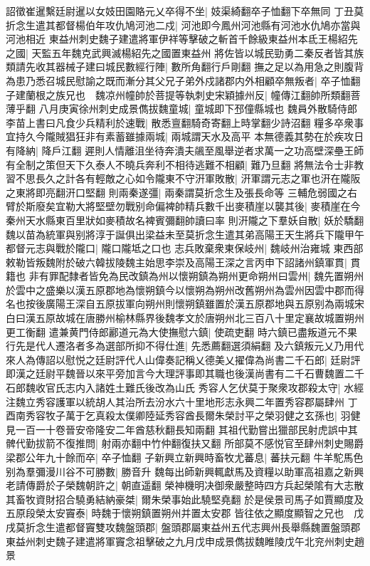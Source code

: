 詔徵崔暹繫廷尉暹以女妓田園賂元乂卒得不坐|{
	妓渠綺翻卒子恤翻下卒無同}
丁丑莫折念生遣其都督楊伯年攻仇鳩河池二戍|{
	河池即今鳳州河池縣有河池水仇鳩亦當與河池相近}
東益州刺史魏子建遣將軍伊祥等擊破之斬首千餘級東益州本氐王楊紹先之國|{
	天監五年魏克武興滅楊紹先之國置東益州}
將佐皆以城民勁勇二秦反者皆其族類請先收其器械子建曰城民數經行陣|{
	數所角翻行戶剛翻}
撫之足以為用急之則腹背為患乃悉召城民慰諭之既而漸分其父兄子弟外戍諸郡内外相顧卒無叛者|{
	卒子恤翻}
子建蘭根之族兄也　魏凉州幢帥於菩提等執刺史宋穎據州反|{
	幢傳江翻帥所類翻菩薄乎翻}
八月庚寅徐州刺史成景儁拔魏童城|{
	童城即下邳僮縣城也}
魏員外散騎侍郎李苗上書曰凡食少兵精利於速戰|{
	散悉亶翻騎奇寄翻上時掌翻少詩沼翻}
糧多卒衆事宜持久今隴賊猖狂非有素蓄雖據兩城|{
	兩城謂天水及高平}
本無德義其勢在於疾攻日有降納|{
	降戶江翻}
遲則人情離沮坐待奔潰夫飊至風舉逆者求萬一之功高壁深壘王師有全制之策但天下久泰人不曉兵奔利不相待逃難不相顧|{
	難乃旦翻}
將無法令士非教習不思長久之計各有輕敵之心如令隴東不守汧軍敗散|{
	汧軍謂元志之軍也汧在隴阪之東將即亮翻汧口堅翻}
則兩秦遂彊|{
	兩秦謂莫折念生及張長命等}
三輔危弱國之右臂於斯廢矣宜勒大將堅壁勿戰别命偏裨帥精兵數千出麥積崖以襲其後|{
	麥積崖在今秦州天水縣東百里狀如麥積故名裨賓彌翻帥讀曰率}
則汧隴之下羣妖自散|{
	妖於驕翻}
魏以苗為統軍與别將淳于誕俱出梁益未至莫折念生遣其弟高陽王天生將兵下隴甲午都督元志與戰於隴口|{
	隴口隴坻之口也}
志兵敗棄衆東保岐州|{
	魏岐州治雍城}
東西部敕勒皆叛魏附於破六韓拔陵魏主始思李崇及高陽王深之言丙申下詔諸州鎮軍貫|{
	貫籍也}
非有罪配隸者皆免為民改鎮為州以懷朔鎮為朔州更命朔州曰雲州|{
	魏先置朔州於雲中之盛樂以漢五原郡地為懷朔鎮今以懷朔為朔州改舊朔州為雲州因雲中郡而得名也按後廣陽王深自五原拔軍向朔州則懷朔鎮雖置於漢五原郡地與五原别為兩城宋白曰漢五原故城在唐勝州榆林縣界後魏孝文於唐朔州北三百八十里定襄故城置朔州更工衡翻}
遣兼黄門侍郎酈道元為大使撫慰六鎮|{
	使疏吏翻}
時六鎮已盡叛道元不果行先是代人遷洛者多為選部所抑不得仕進|{
	先悉薦翻選須絹翻}
及六鎮叛元乂乃用代來人為傳詔以慰悦之廷尉評代人山偉奏記稱乂德美乂擢偉為尚書二千石郎|{
	廷尉評即漢之廷尉平魏晉以來平旁加言今大理評事即其職也後漢尚書有二千石曹魏置二千石郎魏收官氏志内入諸姓土難氏後改為山氏}
秀容人乞伏莫于聚衆攻郡殺太守|{
	水經注魏立秀容護軍以統胡人其治所去汾水六十里地形志永興二年置秀容郡屬肆州}
丁酉南秀容牧子萬于乞真殺太僕卿陸延秀容酋長爾朱榮討平之榮羽健之玄孫也|{
	羽健見一百一十卷晉安帝隆安二年酋慈秋翻長知兩翻}
其祖代勤嘗出獵部民射虎誤中其髀代勤拔箭不復推問|{
	射兩亦翻中竹仲翻復扶又翻}
所部莫不感悦官至肆州刺史賜爵梁郡公年九十餘而卒|{
	卒子恤翻}
子新興立新興時畜牧尤蕃息|{
	蕃扶元翻}
牛羊駝馬色别為羣彌漫川谷不可勝數|{
	勝音升}
魏每出師新興輒獻馬及資糧以助軍高祖嘉之新興老請傳爵於子榮魏朝許之|{
	朝直遥翻}
榮神機明决御衆嚴整時四方兵起榮隂有大志散其畜牧資財招合驍勇結納豪桀|{
	爾朱榮事始此驍堅堯翻}
於是侯景司馬子如賈顯度及五原段榮太安竇泰|{
	時魏于懷朔鎮置朔州并置太安郡}
皆往依之顯度顯智之兄也　戊戌莫折念生遣都督竇雙攻魏盤頭郡|{
	盤頭郡屬東益州五代志興州長舉縣魏置盤頭郡}
東益州刺史魏子建遣將軍竇念祖擊破之九月戊申成景儁拔魏睢陵戊午北兖州刺史趙景

